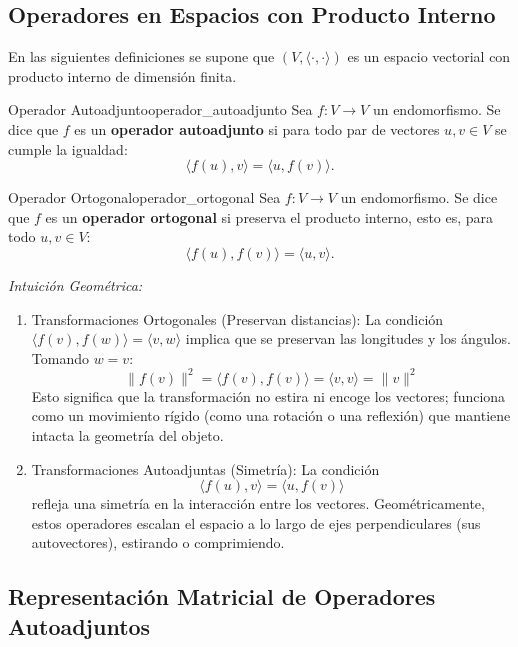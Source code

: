 \documentclass[11pt, a4paper]{article}
\begin{document}
\subsection{Operadores en Espacios con Producto Interno}

En las siguientes definiciones se supone que $(V, \langle \cdot, \cdot \rangle)$ es un espacio vectorial con producto interno de dimensión finita.

\begin{definicion}{Operador Autoadjunto}{operador_autoadjunto}
Sea $f: V \to V$ un endomorfismo. Se dice que $f$ es un \textbf{operador autoadjunto} si para todo par de vectores $u, v \in V$ se cumple la igualdad:
\[ \langle f(u), v \rangle = \langle u, f(v) \rangle. \]
\end{definicion}

\begin{definicion}{Operador Ortogonal}{operador_ortogonal}
Sea $f: V \to V$ un endomorfismo. Se dice que $f$ es un \textbf{operador ortogonal} si preserva el producto interno, esto es, para todo $u, v \in V$:
\[ \langle f(u), f(v) \rangle = \langle u, v \rangle. \]
\end{definicion}

\obs \textit{Intuición Geométrica:}

\begin{enumerate}
    \item[i)] Transformaciones Ortogonales (Preservan distancias):
    La condición $\langle f(v), f(w) \rangle = \langle v, w \rangle$ implica que se preservan las longitudes y los ángulos. Tomando $w = v$:
    \[ \|f(v)\|^2 = \langle f(v), f(v) \rangle = \langle v, v \rangle = \|v\|^2 \]
    Esto significa que la transformación no estira ni encoge los vectores; funciona como un movimiento rígido (como una rotación o una reflexión) que mantiene intacta la geometría del objeto.

    \item[ii)] Transformaciones Autoadjuntas (Simetría):
    La condición \[ \langle f(u), v \rangle = \langle u, f(v) \rangle \] refleja una simetría en la interacción entre los vectores.
    Geométricamente, estos operadores escalan el espacio a lo largo de ejes perpendiculares (sus autovectores), estirando o comprimiendo.
\end{enumerate}

\subsection{Representación Matricial de Operadores Autoadjuntos}
\end{document}
